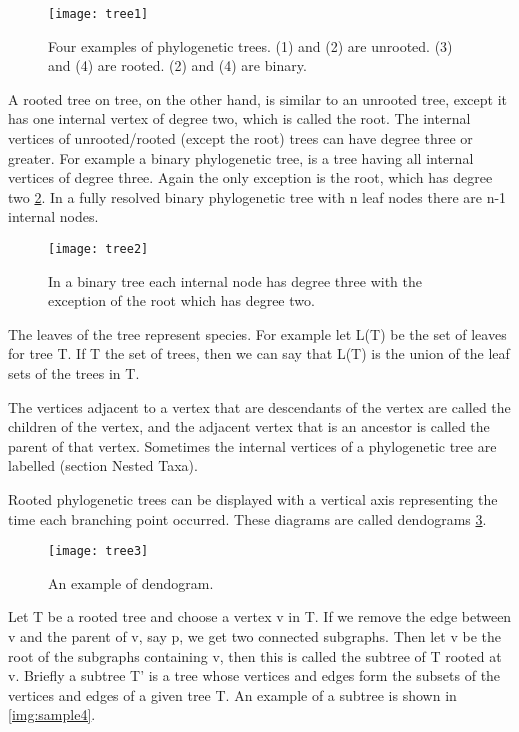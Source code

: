 \begin{figure}[!htbp]
  \center
  \texttt{[image: tree1]}
  \caption[w]{Four examples of phylogenetic trees. (1) and (2) are unrooted. (3) and 
(4) are rooted. (2) and (4) are binary. } 
  \label{img:sample1}  
\end{figure}

A rooted tree on tree, on the other hand, is similar to an unrooted 
tree, except it has one internal vertex of degree two, which is called the 
root. The internal vertices of unrooted/rooted (except the root) trees can 
have degree three or greater. For example a binary phylogenetic tree, is a 
tree having all internal vertices of degree three. Again the only exception is 
the root, which has degree two \ref{img:sample2}. In a fully resolved binary 
phylogenetic tree with n leaf nodes there are n-1 internal nodes. 

\begin{figure}[!htbp] 
  \center
  \texttt{[image: tree2]}
  \caption[w]{In a binary tree each internal node has degree three with the 
exception of the root which has degree two.} 
  \label{img:sample2}  
\end{figure}

The leaves of the tree represent species. For example let L(T) be the 
set of leaves for tree T. If T the set of trees, then we can say that L(T) is the 
union of the leaf sets of the trees in T. 

The vertices adjacent to a vertex that are descendants of the vertex 
are called the children of the vertex, and the adjacent vertex that is an 
ancestor is called the parent of that vertex. Sometimes the internal 
vertices of a phylogenetic tree are labelled (section Nested Taxa). 

Rooted phylogenetic trees can be displayed with a vertical axis 
representing the time each branching point occurred. These diagrams are 
called dendograms \ref{img:sample3}. 

\begin{figure}[!htbp] 
  \center
  \texttt{[image: tree3]}
  \caption[w]{An example of dendogram.} 
  \label{img:sample3}  
\end{figure}

Let T be a rooted tree and choose a vertex v in T. If we remove the 
edge between v and the parent of v, say p, we get two connected 
subgraphs. Then let v be the root of the subgraphs containing v, then this 
is called the subtree of T rooted at v. Briefly a subtree T' is a tree whose 
vertices and edges form the subsets of the vertices and edges of a given 
tree T. An example of a subtree is shown in \ref{img:sample4}.


